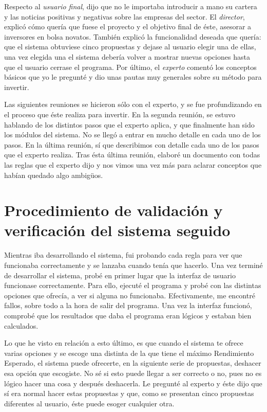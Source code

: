 \documentclass[11pt,openany]{book} %
\begin{document}
Respecto al \textit{\textcolor{ocre}{usuario final}}, dijo que no le importaba introducir a mano su cartera y las noticias positivas y negativas sobre las empresas del sector. El \textit{\textcolor{ocre}{director}}, explicó cómo quería que fuese el proyecto y el objetivo final de éste, asesorar a inversores en bolsa novatos. También explicó la funcionalidad deseada que quería: que el sistema obtuviese cinco propuestas y dejase al usuario elegir una de ellas, una vez elegida una el sistema debería volver a mostrar nuevas opciones hasta que el usuario cerrase el programa. Por último, el \textit{\textcolor{ocre}{experto}} comentó los conceptos básicos que yo le pregunté y dio unas pautas muy generales sobre su método para invertir.

Las siguientes reuniones se hicieron sólo con el experto, y se fue profundizando en el proceso que éste realiza para invertir. En la segunda reunión, se estuvo hablando de los distintos pasos que el experto aplica, y que finalmente han sido los módulos del sistema. No se llegó a entrar en mucho detalle en cada uno de los pasos. En la última reunión, sí que describimos con detalle cada uno de los pasos que el experto realiza. Tras ésta última reunión, elaboré un documento con todas las reglas que el experto dijo y nos vimos una vez más para aclarar conceptos que habían quedado algo ambigüos. 

\section{Procedimiento de validación y verificación del sistema seguido}

Mientras iba desarrollando el sistema, fui probando cada regla para ver que funcionaba correctamente y se lanzaba cuando tenía que hacerlo. Una vez terminé de desarrollar el sistema, probé en primer lugar que la interfaz de usuario funcionase correctamente. Para ello, ejecuté el programa y probé con las distintas opciones que ofrecía, a ver si alguna no funcionaba. Efectivamente, me encontré fallos, sobre todo a la hora de salir del programa. Una vez la interfaz funcionó, comprobé que los resultados que daba el programa eran lógicos y estaban bien calculados.

Lo que he visto en relación a esto último, es que cuando el sistema te ofrece varias opciones y se escoge una distinta de la que tiene el máximo Rendimiento Esperado, el sistema puede ofrecerte, en la siguiente serie de propuestas, deshacer esa opción que escogiste. No sé si esto puede llegar a ser correcto o no, pues no es lógico hacer una cosa y después deshacerla. Le pregunté al experto y éste dijo que sí era normal hacer estas propuestas y que, como se presentan cinco propuestas diferentes al usuario, éste puede esoger cualquier otra.
\end{document}
